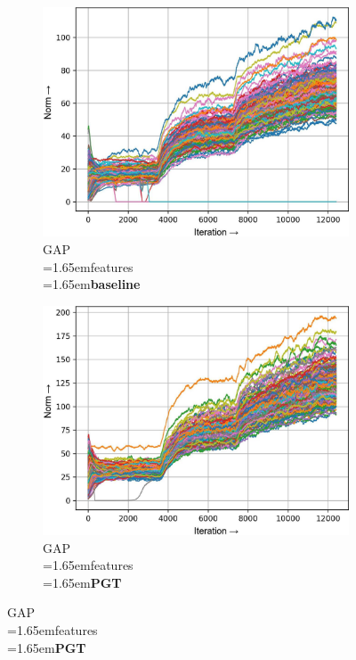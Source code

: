 \documentclass[runningheads]{llncs}
\newcommand{\forceindentb}{\parindent=1.65em\indent\parindent=0pt\relax}
\begin{document}
\begin{figure}[t]
\begin{subfigure}[t]{0.16\textwidth}
\includegraphics[width=\textwidth]{trimmed/baseline-f-layer-22-1}
\caption{\scriptsize{GAP\\\forceindentb features}\\ \forceindentb\textbf{baseline}}
\end{subfigure}
\begin{subfigure}[t]{0.16\textwidth}
\includegraphics[width=\textwidth]{trimmed/pgt-f-layer-22-1}
\caption{\scriptsize{GAP\\\forceindentb features}\\ \forceindentb\textbf{PGT}}
\end{subfigure}

\vspace{6pt}


\end{figure}
\end{document}

